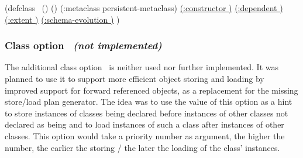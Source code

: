 
\begin{CompactCode}
(defclass \ ()
  ()
  (:metaclass persistent-metaclass)
  \underline{(:constructor )}  
  \underline{(:dependent )}
  \underline{(:extent )}
  \underline{(:schema-evolution )}
  )
\end{CompactCode}

\subsubsection{Class option
\protect{}\ \protect\emph{(not implemented)}}%
\label{sec:ClassDeferred}

The additional class option \ is neither used nor
further implemented. It was planned to use it to support more
efficient object storing and loading by improved support for forward
referenced objects, as a replacement for the missing store/load
plan generator. The idea was to use the value of this option as a hint
to store instances of classes being declared  before
instances of other classes not declared as being  and
to load instances of such a class after instances of other classes.
This option would take a priority number as argument, the higher the
number, the earlier the storing / the later the loading of the
class' instances.


